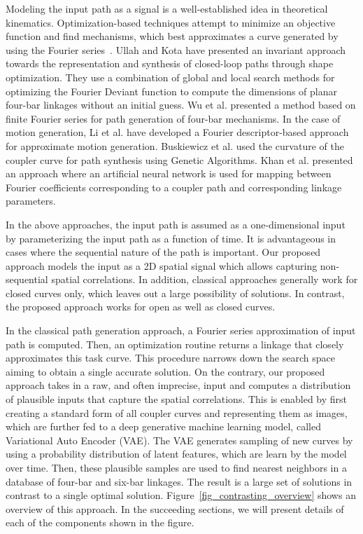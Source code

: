 Modeling the input path as a signal is a well-established idea in theoretical kinematics. Optimization-based techniques attempt to minimize an objective function and find mechanisms, which best approximates a curve generated by using the Fourier series~\cite{nolle1971}. Ullah and Kota\cite{ullah1997} have presented an invariant approach towards the representation and synthesis of closed-loop paths through shape optimization. They use a combination of global and local search methods for optimizing the Fourier Deviant function to compute the dimensions of planar four-bar linkages without an initial guess. Wu et al.\cite{wu2011} presented a method based on finite Fourier series for path generation of four-bar mechanisms.
In the case of motion generation, Li et al.\cite{li2016} have developed a Fourier descriptor-based approach for approximate motion generation.
Buskiewicz et al.\cite{Buskiewicz2009} used the curvature of the coupler curve for path synthesis using Genetic Algorithms.
Khan et al.\cite{khan2015} presented an approach where an artificial neural network is used for mapping between Fourier coefficients corresponding to a coupler path and corresponding linkage parameters.

In the above approaches, the input path is assumed as a one-dimensional input by parameterizing the input path as a function of time. It is advantageous in cases where the sequential nature of the path is important. Our proposed approach models the input as a 2D spatial signal which allows capturing non-sequential spatial correlations. In addition, classical approaches generally work for closed curves only, which leaves out a large possibility of solutions. In contrast, the proposed approach works for open as well as closed curves.  

In the classical path generation approach, a Fourier series approximation of input path is computed. Then, an optimization routine returns a linkage that closely approximates this task curve. This procedure narrows down the search space aiming to obtain a single accurate solution. On the contrary, our proposed approach takes in a raw, and often imprecise, input and computes a distribution of plausible inputs that capture the spatial correlations. This is enabled by first creating a standard form of all coupler curves and representing them as images, which are further fed to a deep generative machine learning model, called Variational Auto Encoder (VAE). The VAE generates sampling of new curves by using a probability distribution of latent features, which are learn by the model over time. Then, these plausible samples are used to find nearest neighbors in a database of four-bar and six-bar linkages. The result is a large set of solutions in contrast to a single optimal solution. Figure~\ref{fig_contrasting_overview} shows an overview of this approach. In the succeeding sections, we will present details of each of the components shown in the figure.

